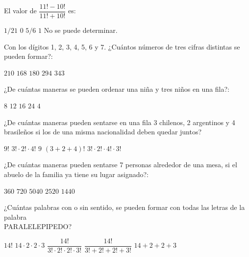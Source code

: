 \documentclass[]{srs}
\begin{document}
\begin{preguntas}[after-item-skip=2cm]
  \pregunta El valor de $\dfrac{11!-10!}{11!+10!}$ es: \\
  \begin{vertical}
    \alternativa $1/21$
    \alternativa $0$
    \alternativa $5/6$
    \alternativa $1$
    \alternativa No se puede determinar.

  \end{vertical}

  \pregunta Con los dígitos 1, 2, 3, 4, 5, 6 y 7. ¿Cuántos números de tres cifras distintas
  se pueden formar?: \\
  \begin{vertical}
    \alternativa $210$
    \alternativa $168$
    \alternativa $180$
    \alternativa $294$
    \alternativa $343$
  \end{vertical}

  \pregunta ¿De cuántas maneras se pueden ordenar una niña y tres niños en una fila?: \\
  \begin{vertical}
    \alternativa $8$
    \alternativa $12$
    \alternativa $16$
    \alternativa $24$
    \alternativa $4$
  \end{vertical}

  \pregunta ¿De cuántas maneras pueden sentarse en una fila 3 chilenos, 2 argentinos y
  4 brasileños si los de una misma nacionalidad deben quedar juntos? \\
  \begin{vertical}
    \alternativa $9!$
    \alternativa $3!\cdot 2!\cdot 4!$
    \alternativa $9$
    \alternativa $(3+2+4)!$
    \alternativa $3!\cdot 2!\cdot 4!\cdot 3!$
  \end{vertical}

  \pregunta ¿De cuántas maneras pueden sentarse 7 personas alrededor de una mesa, si
  el abuelo de la familia ya tiene su lugar asignado?: \\
  \begin{vertical}
    \alternativa $360$
    \alternativa $720$
    \alternativa $5040$
    \alternativa $2520$
    \alternativa $1440$
  \end{vertical}

  \pregunta ¿Cuántas palabras con o sin sentido, se pueden formar con todas las
  letras de la palabra \\\mbox{PARALELEPIPEDO}? \\
  \begin{vertical}
    \alternativa $14!$
    \alternativa $14\cdot 2\cdot 2\cdot 3$
    \alternativa $\dfrac{14!}{3!\cdot 2!\cdot 2!\cdot 3!}$
    \alternativa $\dfrac{14!}{3!+2!+2!+3!}$
    \alternativa $14 + 2 + 2 + 3$
  \end{vertical}


\end{preguntas}
\end{document}
